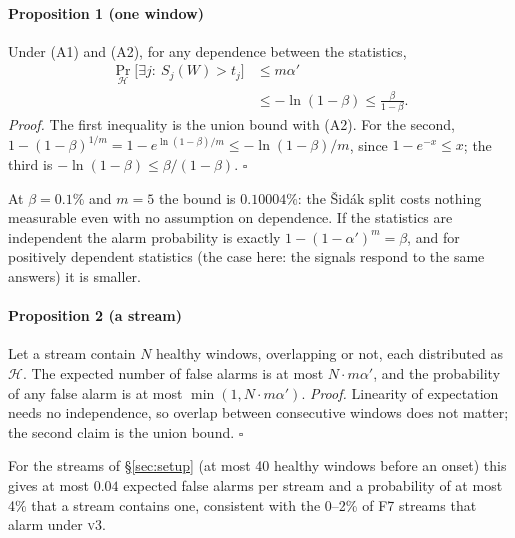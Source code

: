 \documentclass[11pt]{article}
\newcommand{\vthree}{\textsc{v3}}
\begin{document}
\paragraph{Proposition 1 (one window)}
Under (A1) and (A2), for any dependence between the statistics,
\begin{align*}
  \Pr_{\mathcal{H}}\bigl[\exists j:\ S_j(W)>t_j\bigr]
  &\le m\alpha' \\
  &\le -\ln(1-\beta) \le \frac{\beta}{1-\beta}.
\end{align*}
\emph{Proof.} The first inequality is the union bound with (A2). For the second,
$1-(1-\beta)^{1/m}=1-e^{\ln(1-\beta)/m}\le-\ln(1-\beta)/m$, since $1-e^{-x}\le x$; the
third is $-\ln(1-\beta)\le\beta/(1-\beta)$. \hfill$\square$

At $\beta=0.1\%$ and $m=5$ the bound is $0.10004\%$: the Šidák split costs nothing
measurable even with no assumption on dependence. If the statistics are
independent the alarm probability is exactly $1-(1-\alpha')^m=\beta$, and for
positively dependent statistics (the case here: the signals respond to the same
answers) it is smaller.

\paragraph{Proposition 2 (a stream)}
Let a stream contain $N$ healthy windows, overlapping or not, each distributed as
$\mathcal{H}$. The expected number of false alarms is at most
$N\cdot m\alpha'$, and the probability of any false alarm is at most
$\min(1,N\cdot m\alpha')$.
\emph{Proof.} Linearity of expectation needs no independence, so overlap between
consecutive windows does not matter; the second claim is the union bound. \hfill$\square$

For the streams of \S\ref{sec:setup} (at most 40 healthy windows before an onset)
this gives at most $0.04$ expected false alarms per stream and a probability of at
most 4\% that a stream contains one, consistent with the 0--2\% of F7 streams that
alarm under \vthree{}.
\end{document}
